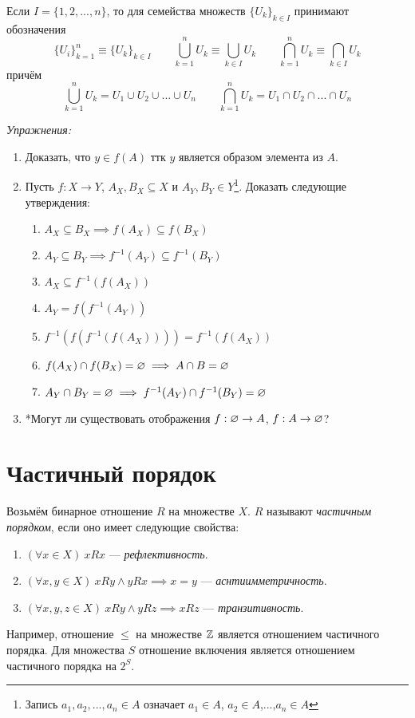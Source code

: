 Если $I=\{1,2,...,n\}$, то для семейства множеств $\{U_{k}\}_{k\in I}$ принимают
обозначения
\[
	\{U_{i}\}_{k=1}^{n}\equiv\{U_{k}\}_{k\in I}\qquad
	\bigcup_{k=1}^{n}U_{k}\equiv\bigcup_{k\in I}U_{k}\qquad
	\bigcap_{k=1}^{n}U_{k}\equiv\bigcap_{k\in I}U_{k}
\]
причём
\[
	\bigcup_{k=1}^{n}U_{k}=U_1\cup U_2\cup ...\cup U_{n}\qquad
	\bigcap_{k=1}^{n}U_{k}=U_1\cap U_2\cap ...\cap U_{n}
\]

\vspace{1em}
{\it Упражнения:}
\begin{enumerate}
	\item{}Доказать, что $y\in f(A)$ ттк $y$ является образом элемента из $A$.
	\item{}Пусть ${f:X\to Y}$, ${A_{X},B_{X}\subseteq X}$ и
		${A_{Y},B_{Y}\in Y}$\footnote{Запись $a_1,a_2,...,a_{n}\in A$ означает
		$a_1\in A$, $a_2\in A$,...,$a_{n}\in A$}.
		Доказать следующие утверждения:
		\begin{enumerate}
			\item{}$A_{X}\subseteq B_{X}\implies f(A_{X})\subseteq f(B_{X})$
			\item{}$A_{Y}\subseteq B_{Y}\implies f^{-1}(A_{Y})\subseteq f^{-1}(B_{Y})$
			\item{}$A_{X}\subseteq f^{-1}(f(A_{X}))$
			\item{}$A_{Y}=f(f^{-1}(A_{Y}))$
			\item{}$f^{-1}(f(f^{-1}(f(A_{X}))))=f^{-1}(f(A_{X}))$
			\item{}$f(A_{X})\cap f(B_{X})=\varnothing\implies A\cap B=\varnothing$
			\item{}$A_{Y}\cap B_{Y}=\varnothing\implies f^{-1}(A_{Y})\cap f^{-1}(B_{Y})=\varnothing$
		\end{enumerate}
	\item{}*Могут ли существовать отображения $f:\varnothing\to A$, $f:A\to\varnothing$?
\end{enumerate}

\section{Частичный порядок}

Возьмём бинарное отношение $R$ на множестве $X$. $R$ называют {\it частичным порядком},
если оно имеет следующие свойства:
\begin{enumerate}
	\item{}$(\forall x\in X)~xRx$ --- {\it рефлективность}.
	\item{}$(\forall x,y\in X)~xRy\land yRx\implies x=y$
		--- {\it аснтиимметричность}.
	\item{}$(\forall x,y,z\in X)~xRy\land yRz\implies xRz$ --- {\it транзитивность}.
\end{enumerate}
Например, отношение $\leq$ на множестве $\mathbb Z$ является отношением частичного порядка.
Для множества $S$ отношение включения является
отношением частичного порядка на $2^{S}$.

